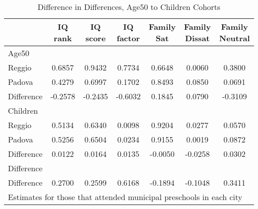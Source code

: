 \begin{table}[htbp]\centering
\caption{Difference in Differences, Age50 to Children Cohorts}
\begin{tabular}{l*{6}{c}}
\hline\hline
            &     IQ rank&    IQ score&   IQ factor&  Family Sat&Family Dissat&Family Neutral\\
\hline
Age50       &            &            &            &            &            &            \\
Reggio      &      0.6857&      0.9432&      0.7734&      0.6648&      0.0060&      0.3800\\
Padova      &      0.4279&      0.6997&      0.1702&      0.8493&      0.0850&      0.0691\\
Difference  &     -0.2578&     -0.2435&     -0.6032&      0.1845&      0.0790&     -0.3109\\
\hline
Children    &            &            &            &            &            &            \\
Reggio      &      0.5134&      0.6340&      0.0098&      0.9204&      0.0277&      0.0570\\
Padova      &      0.5256&      0.6504&      0.0234&      0.9155&      0.0019&      0.0872\\
Difference  &      0.0122&      0.0164&      0.0135&     -0.0050&     -0.0258&      0.0302\\
\hline
Difference  &            &            &            &            &            &            \\
Difference  &      0.2700&      0.2599&      0.6168&     -0.1894&     -0.1048&      0.3411\\
\hline\hline
\multicolumn{7}{l}{\footnotesize Estimates for those that attended municipal preschools in each city}\\
\end{tabular}
\end{table}
